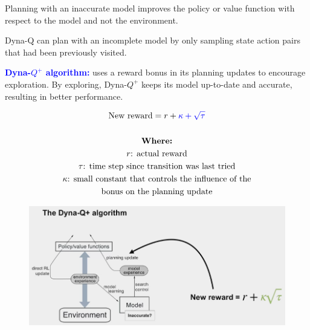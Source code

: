 \documentclass[12pt, a4paper]{article}
\begin{document}
Planning with an inaccurate model improves the policy or value function with respect to the model and not the environment.

Dyna-Q can plan with an incomplete model by only sampling state action pairs that had been previously visited.





\textbf{\textcolor{blue}{Dyna-$Q^+$ algorithm:}} uses a reward bonus in its planning updates to encourage exploration. By exploring, Dyna-$Q^+$ keeps its model up-to-date and accurate, resulting in better performance.

\begin{gather*}
\text{New reward} = r + \textcolor{blue}{\kappa + \sqrt{\tau}} \\ \\
  \textbf{Where:} \\
  r \text{: actual reward} \\
  \tau \text{: time step since transition was last tried} \\
  \kappa  \text{: small constant that controls the influence of the} \\ \text{bonus on the planning update}
\end{gather*}

\begin{figure}[H]
  \centering
    \includegraphics[width=0.9\columnwidth]{images/dyna-q-plus.png}
    \label{fig:dyna-q-plus}
\end{figure}
\end{document}
